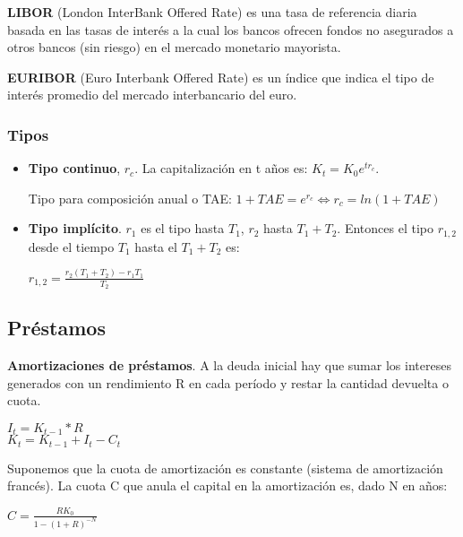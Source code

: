 \documentclass[
10pt, %
a4paper, %
oneside, %
headinclude,footinclude, %
BCOR5mm, %
]{scrartcl}
\newcommand{\n}[1]{\textbf{#1}}
\newcommand{\sub}[1]{_{#1}}
\newcommand{\pot}[1]{^{#1}}
\newcommand{\f}[1]{{\large{${#1}$}}}
\newcommand{\sii}[0]{\Leftrightarrow}
\newcounter{ex}
\begin{document}
		\vspace{0.3cm}

		\n{LIBOR} (London InterBank Offered Rate) es una tasa de referencia diaria basada en las tasas de interés a la cual los bancos ofrecen fondos no asegurados a otros bancos (sin riesgo) en el mercado monetario mayorista.

		\n{EURIBOR} (Euro Interbank Offered Rate) es un índice que indica el tipo de interés promedio del mercado interbancario del euro.

		\subsubsection{Tipos}

			\begin{itemize}
				\item \n{Tipo continuo}, \f{r\sub{c}}. La capitalización en t años es: \f{K\sub{t} = K\sub{0}e\pot{tr\sub{c}}}. 

				Tipo para composición anual o TAE: \f{1 + TAE = e\pot{r\sub{c}} \sii r\sub{c} = ln(1 + TAE)}

				\item \n{Tipo implícito}. \f{r\sub{1}} es el tipo hasta \f{T\sub{1}}, \f{r\sub{2}} hasta \f{T\sub{1} + T\sub{2}}. Entonces el tipo \f{r\sub{1,2}} desde el tiempo \f{T\sub{1}} hasta el \f{T\sub{1}+T\sub{2}} es: 
				\begin{center} \f{r\sub{1,2} = \frac{r\sub{2}(T\sub{1}+T\sub{2}) - r\sub{1}T\sub{1}}{T\sub{2}}} \end{center}
			\end{itemize}

	\subsection{Préstamos}

		\n{Amortizaciones de préstamos}. A la deuda inicial hay que sumar los intereses generados con un rendimiento R en cada período y restar la cantidad devuelta o cuota.
		\begin{center} \f{I\sub{t} = K\sub{t-1} * R} \\ \f{K\sub{t} = K\sub{t-1} + I\sub{t} - C\sub{t}} \end{center}

		Suponemos que la cuota de amortización es constante (sistema de amortización francés). La cuota C que anula el capital en la amortización es, dado N en años:
		\begin{center} \f{C = \frac{RK\sub{0}}{1 - (1 + R)\pot{-N}}} \end{center}
\end{document}
